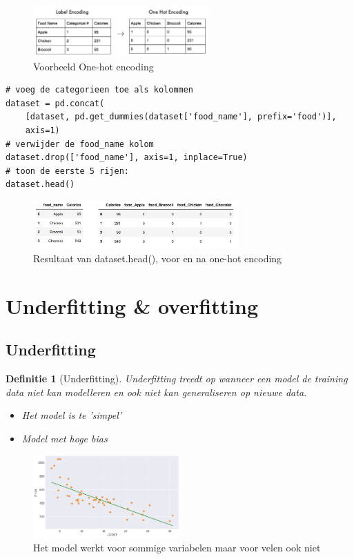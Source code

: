 \documentclass{article}
\newtheorem{theorem}{Definitie}[section]
\begin{document}
\begin{figure}[H]
    \centering
    \includegraphics[width=0.6\textwidth]{one-hot-encoding.png}
    \caption{Voorbeeld One-hot encoding}
\end{figure}

\begin{verbatim}
# voeg de categorieen toe als kolommen
dataset = pd.concat(
    [dataset, pd.get_dummies(dataset['food_name'], prefix='food')], 
    axis=1)
# verwijder de food_name kolom
dataset.drop(['food_name'], axis=1, inplace=True)
# toon de eerste 5 rijen:
dataset.head()
\end{verbatim}

\begin{figure}[H]
    \centering
    \includegraphics[width=0.7\textwidth]{one-hot-encoding2.png}
    \caption{Resultaat van dataset.head(), voor en na one-hot encoding}
\end{figure}

\section{Underfitting \& overfitting}

\subsection{Underfitting}

\begin{theorem}[Underfitting]
Underfitting treedt op wanneer een model de training data niet kan modelleren 
en ook niet kan generaliseren op nieuwe data.

\begin{itemize}
    \item Het model is te 'simpel'
    \item Model met hoge bias
\end{itemize}
\end{theorem}

\begin{figure}[H]
    \centering
    \includegraphics[width=0.5\textwidth]{underfitting.png}
    \caption{Het model werkt voor sommige variabelen maar voor velen ook niet}
\end{figure}
\end{document}
